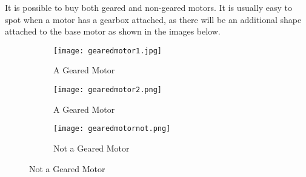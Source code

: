 \documentclass[../TinyBot.tex]{subfiles}
\begin{document}
It is possible to buy both geared and non-geared motors. It is usually easy to spot when a motor has a gearbox attached, as there will be an additional shape attached to the base motor as shown in the images below. 


\begin{figure}[h!]
    \centering
    \begin{subfigure}[t]{0.3\textwidth}
        \texttt{[image: gearedmotor1.jpg]}
        \caption{A Geared Motor}
    \end{subfigure}
    \begin{subfigure}[t]{0.3\textwidth}
        \centering
        \texttt{[image: gearedmotor2.png]}
        \caption{A Geared Motor}
    \end{subfigure}
    \begin{subfigure}[t]{0.3\textwidth}
        \texttt{[image: gearedmotornot.png]}
        \caption{Not a Geared Motor}
    \end{subfigure}
\end{figure}



\end{document}

